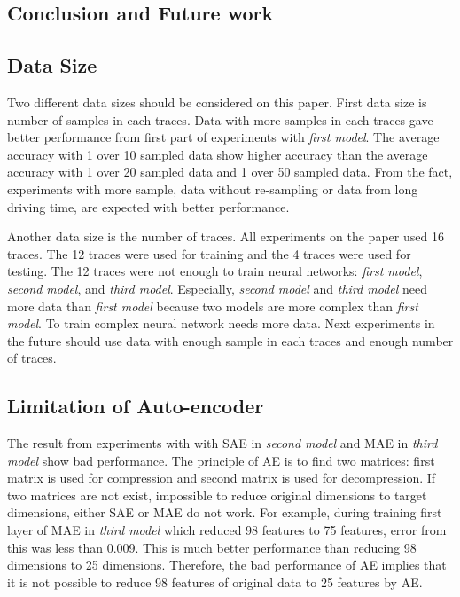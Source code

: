 \documentclass[draft,dvipsnames]{drexel-thesis}
\begin{document}
\begin{thesis}
\chapter{Conclusion and Future work}
\section{Data Size}
Two different data sizes should be considered on this paper. First data size is number of samples in each traces. Data with more samples in each traces gave better performance from first part of experiments with {\em first model}. The average accuracy with 1 over 10 sampled data show higher accuracy than the average accuracy with 1 over 20 sampled data and 1 over 50 sampled data. From the fact, experiments with more sample, data without re-sampling or data from long driving time, are expected with better performance. 

Another data size is the number of traces. All experiments on the paper used 16 traces. The 12 traces were used for training and the 4 traces were used for testing. The 12 traces were not enough to train neural networks: {\em first model}, {\em second model}, and {\em third model}. Especially, {\em second model} and {\em third model} need more data than {\em first model} because two models are more complex than {\em first model}. To train complex neural network needs more data. Next experiments in the future should use data with enough sample in each traces and enough number of traces. 

\section{Limitation of Auto-encoder}
The result from experiments with with SAE in {\em second model} and MAE in {\em third model} show bad performance. The principle of AE is to find two matrices: first matrix is used for compression and second matrix is used for decompression. If two matrices are not exist, impossible to reduce original dimensions to target dimensions, either SAE or MAE do not work. For example, during training first layer of MAE in {\em third model} which reduced 98 features to 75 features, error from this was less than 0.009. This is much better performance than reducing 98 dimensions to 25 dimensions. Therefore, the bad performance of AE implies that it is not possible to reduce 98 features of original data to 25 features by AE.


\end{thesis}
\end{document}
